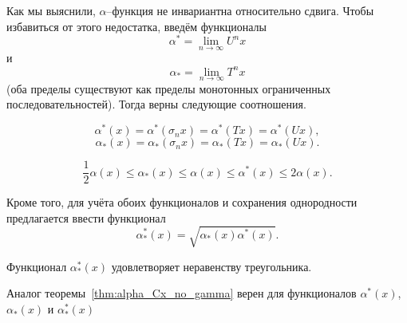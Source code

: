 Как мы выяснили, $\alpha$--функция не инвариантна относительно сдвига.
Чтобы избавиться от этого недостатка, введём функционалы
\begin{equation}
	\alpha^* = \lim_{n\to\infty} U^n x
\end{equation}
и
\begin{equation}
	\alpha_* = \lim_{n\to\infty} T^n x
\end{equation}
(оба пределы существуют как пределы монотонных ограниченных последовательностей).
Тогда верны следующие соотношения.
\begin{lemma}
	\begin{equation}
		\alpha^*(x) = \alpha^*(\sigma_n x) = \alpha^*(Tx) = \alpha^*(Ux)
		,
	\end{equation}
	\begin{equation}
		\alpha_*(x) = \alpha_*(\sigma_n x) = \alpha_*(Tx) = \alpha_*(Ux)
		.
	\end{equation}
\end{lemma}

\begin{lemma}
	\begin{equation}
		\frac{1}{2} \alpha(x) \leq \alpha_*(x) \leq \alpha(x) \leq \alpha^*(x) \leq 2 \alpha(x)
		.
	\end{equation}
\end{lemma}

Кроме того, для учёта обоих функционалов и сохранения однородности предлагается ввести функционал
\begin{equation}
	\alpha_*^*(x) = \sqrt{\alpha_*(x)\alpha^*(x)}
	.
\end{equation}

\begin{hypothesis}
	Функционал $\alpha_*^*(x)$ удовлетворяет неравенству треугольника.
\end{hypothesis}

\begin{hypothesis}
	Аналог теоремы~\ref{thm:alpha_Cx_no_gamma} верен для функционалов
	$\alpha^*(x)$, $\alpha_*(x)$ и $\alpha_*^*(x)$
\end{hypothesis}

